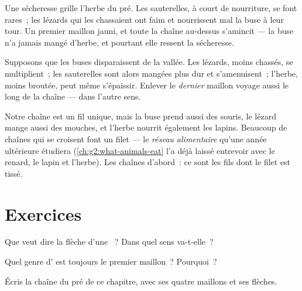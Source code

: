 \begin{example}\label{ex:g3:food-chains:dry}
Une sécheresse grille l'herbe du pré. Les sauterelles, à court de
nourriture, se font rares~; les lézards qui les chassaient ont faim
et nourrissent mal la buse à leur tour. Un premier maillon jauni, et
toute la chaîne au-dessus s'amincit --- la buse n'a jamais mangé
d'herbe, et pourtant elle ressent la sécheresse.
\end{example}

\begin{example}\label{ex:g3:food-chains:hunter}
Supposons que les buses disparaissent de la vallée. Les lézards,
moins chassés, se multiplient~; les sauterelles sont alors mangées
plus dur et s'amenuisent~; l'herbe, moins broutée, peut même
s'épaissir. Enlever le \emph{dernier} maillon voyage aussi le long
de la chaîne --- dans l'autre sens.
\end{example}

\begin{remark}\label{rem:g3:food-chains:web}
Notre chaîne est un fil unique, mais la buse prend aussi des
souris, le lézard mange aussi des mouches, et l'herbe nourrit
également les lapins. Beaucoup de chaînes qui se croisent font un
filet --- le \emph{réseau alimentaire} qu'une année ultérieure
étudiera (\cref{ch:g2:what-animals-eat} l'a déjà laissé entrevoir
avec le renard, le lapin et l'herbe). Les chaînes d'abord~: ce sont
les fils dont le filet est tissé.
\end{remark}

\section{Exercices}

\begin{exercise}[$\star$]\label{exo:g3:food-chains:1}
Que veut dire la flèche d'une ~? Dans quel sens
va-t-elle~?
\end{exercise}

\begin{exercise}[$\star$]\label{exo:g3:food-chains:2}
Quel genre d' est toujours le premier maillon~? Pourquoi~?
\end{exercise}

\begin{exercise}[$\star$]\label{exo:g3:food-chains:3}
Écris la chaîne du pré de ce chapitre, avec ses quatre maillons et
ses flèches.
\end{exercise}

